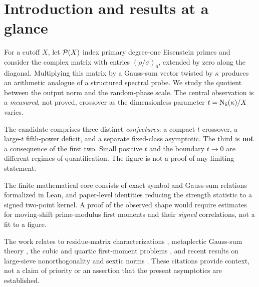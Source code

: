 \section{Introduction and results at a glance}\label{sec:intro}
For a cutoff \(X\), let \(\mathcal P(X)\) index primary degree-one Eisenstein
primes and consider the complex matrix with entries
\((\rho/\sigma)_6\), extended by zero along the diagonal.
Multiplying this matrix by a Gauss-sum vector twisted by
\(\kappa\) produces an arithmetic analogue of a structured spectral
probe. We study the quotient between the output norm and the
random-phase scale. The central observation is a \emph{measured},
not proved, crossover as the dimensionless parameter
\(t=\operatorname{N}_6(\kappa)/X\) varies.


The candidate comprises three distinct \emph{conjectures}:
a compact-\(t\) crossover, a large-\(t\) fifth-power deficit,
and a separate fixed-class asymptotic. The third is \textbf{not}
a consequence of the first two. Small positive \(t\) and the boundary
\(t\to0\) are different regimes of quantification. The figure is not
a proof of any limiting statement.

The finite mathematical core consists of exact symbol and Gauss-sum
relations formalized in Lean, and paper-level identities reducing the
strength statistic to a signed two-point kernel. A proof of the observed
shape would require estimates for moving-shift prime-modulus first
moments and their \emph{signed} correlations, not a fit to a figure.

The work relates to residue-matrix characterizations
\cite{ddk2016}, metaplectic Gauss-sum theory
\cite{patterson1987,kazhdan1984,broeker2013,chinta2003},
the cubic and quartic first-moment problems
\cite{dunn2024,ddhl2023}, and recent results on large-sieve
nonorthogonality and sextic norms
\cite{dfdh2026,xusang2026}. These citations provide context, not
a claim of priority or an assertion that the present asymptotics
are established.
